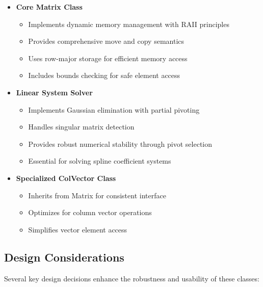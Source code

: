 \documentclass{article}
\begin{document}
\begin{itemize}
    \item \textbf{Core Matrix Class}
    \begin{itemize}
        \item Implements dynamic memory management with RAII principles
        \item Provides comprehensive move and copy semantics
        \item Uses row-major storage for efficient memory access
        \item Includes bounds checking for safe element access
    \end{itemize}
    
    \item \textbf{Linear System Solver}
    \begin{itemize}
        \item Implements Gaussian elimination with partial pivoting
        \item Handles singular matrix detection
        \item Provides robust numerical stability through pivot selection
        \item Essential for solving spline coefficient systems
    \end{itemize}
    
    \item \textbf{Specialized ColVector Class}
    \begin{itemize}
        \item Inherits from Matrix for consistent interface
        \item Optimizes for column vector operations
        \item Simplifies vector element access
    \end{itemize}
\end{itemize}

\subsection{Design Considerations}
Several key design decisions enhance the robustness and usability of these classes:
\end{document}
